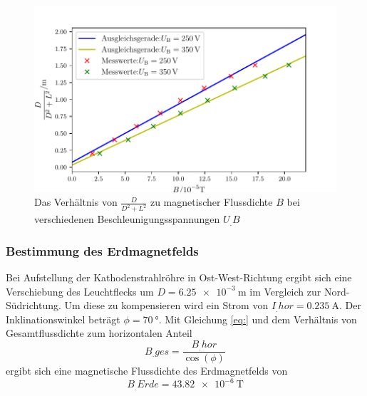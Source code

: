 \begin{figure}
\centering
\includegraphics[width=\linewidth-70pt,height=\textheight-70pt,keepaspectratio]{content/images/GraphMag1.pdf}
\caption{Das Verhältnis von $\frac{D}{D^2+L^2}$ zu magnetischer Flussdichte $B$ bei verschiedenen Beschleunigungsspannungen $U_.B$}\label{fig:Mag}
\end{figure}
\subsubsection{Bestimmung des Erdmagnetfelds}
Bei Aufstellung der Kathodenstrahlröhre in Ost-West-Richtung ergibt sich eine Verschiebung des Leuchtflecks um $D=\SI{6,25e-3}{\metre}$ im Vergleich zur Nord-Südrichtung.
Um diese zu kompensieren wird ein Strom von $I_.{hor}=\SI{0,235}{\ampere}$. Der Inklinationswinkel beträgt $\phi=\SI{70}{\degree}$. Mit Gleichung \eqref{eq:}
und dem Verhältnis von Gesamtflussdichte zum horizontalen Anteil
\[
B_.{ges}= \frac{B_.{hor}}{\cos(\phi)}
\]
ergibt sich eine magnetische Flussdichte des Erdmagnetfelds von
\[
B_.{Erde}=\SI{43,82e-6}{\tesla}
\]
